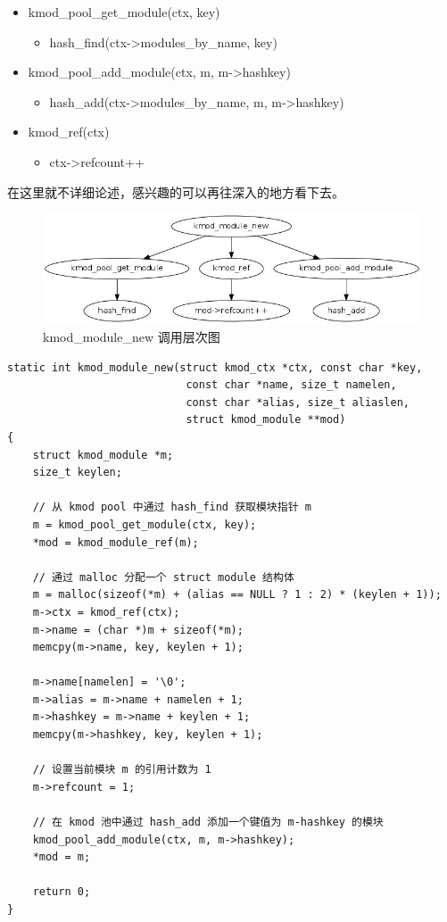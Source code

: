\begin{itemize}
\item
  kmod\_pool\_get\_module(ctx, key)
  \begin{itemize}
  \item
    hash\_find(ctx-\textgreater{}modules\_by\_name, key)
  \end{itemize}
\item
  kmod\_pool\_add\_module(ctx, m, m-\textgreater{}hashkey)
  \begin{itemize}
  \item
    hash\_add(ctx-\textgreater{}modules\_by\_name, m,
    m-\textgreater{}hashkey)
  \end{itemize}
\item
  kmod\_ref(ctx)
  \begin{itemize}
  \item
    ctx-\textgreater{}refcount++
  \end{itemize}
\end{itemize}
在这里就不详细论述，感兴趣的可以再往深入的地方看下去。

\begin{figure}[htbp]
\centering
\includegraphics{./figures/kmod_module_new.jpg}
\caption{kmod\_module\_new 调用层次图}
\end{figure}

{\begin{shaded}\begin{verbatim}
static int kmod_module_new(struct kmod_ctx *ctx, const char *key,
                            const char *name, size_t namelen,
                            const char *alias, size_t aliaslen,
                            struct kmod_module **mod)
{
    struct kmod_module *m;
    size_t keylen;

    // 从 kmod pool 中通过 hash_find 获取模块指针 m
    m = kmod_pool_get_module(ctx, key);
    *mod = kmod_module_ref(m);

    // 通过 malloc 分配一个 struct module 结构体
    m = malloc(sizeof(*m) + (alias == NULL ? 1 : 2) * (keylen + 1));
    m->ctx = kmod_ref(ctx);
    m->name = (char *)m + sizeof(*m);
    memcpy(m->name, key, keylen + 1);

    m->name[namelen] = '\0';
    m->alias = m->name + namelen + 1;
    m->hashkey = m->name + keylen + 1;
    memcpy(m->hashkey, key, keylen + 1);

    // 设置当前模块 m 的引用计数为 1
    m->refcount = 1;

    // 在 kmod 池中通过 hash_add 添加一个键值为 m-hashkey 的模块
    kmod_pool_add_module(ctx, m, m->hashkey);
    *mod = m;

    return 0;
}
\end{verbatim}\end{shaded}}
